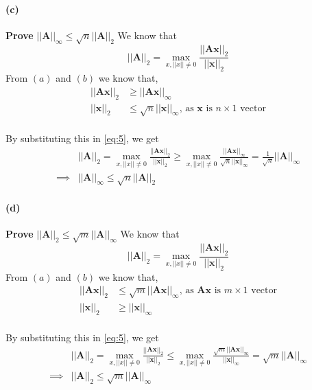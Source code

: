 \documentclass[12pt, letterpaper]{article}
\begin{document}
\paragraph{(c)} \textbf{Prove} $||\mathbf{A}||_\infty \leq \sqrt{n}||\mathbf{A}||_2$
We know that
\begin{equation}
  \label{eq:5}
  ||\mathbf{A}||_2 = \max_{x, ||x|| \not = 0}\frac{||\mathbf{Ax}||_2}{||\mathbf{x}||_2}
\end{equation}
From $(a)$ and $(b)$ we know that,
\begin{align*}
  ||\mathbf{Ax}||_2 &\geq ||\mathbf{Ax}||_{\infty}\\
  ||\mathbf{x}||_2 &\leq \sqrt{n}||\mathbf{x}||_{\infty}\text{, as $\mathbf{x}$ is $n \times 1$ vector}\\
\end{align*}

By substituting this in \eqref{eq:5}, we get
\begin{align*}
  &||\mathbf{A}||_2 = \max_{x, ||x|| \not = 0}\frac{||\mathbf{Ax}||_2}{||\mathbf{x}||_2}
  \geq \max_{x, ||x|| \not = 0}\frac{||\mathbf{Ax}||_{\infty}}{\sqrt{n}||\mathbf{x}||_{\infty}}
  = \frac{1}{\sqrt{n}}||\mathbf{A}||_{\infty}\\
  \implies &\boxed{||\mathbf{A}||_\infty \leq \sqrt{n}||\mathbf{A}||_2}
\end{align*}

\paragraph{(d)} \textbf{Prove} $||\mathbf{A}||_2 \leq \sqrt{m}||\mathbf{A}||_\infty$
We know that
\begin{equation}
  \label{eq:5}
  ||\mathbf{A}||_2 = \max_{x, ||x|| \not = 0}\frac{||\mathbf{Ax}||_2}{||\mathbf{x}||_2}
\end{equation}
From $(a)$ and $(b)$ we know that,
\begin{align*}
  ||\mathbf{Ax}||_2 &\leq \sqrt{m}||\mathbf{Ax}||_{\infty}\text{, as $\mathbf{Ax}$ is $m \times 1$ vector}\\
  ||\mathbf{x}||_2 &\geq ||\mathbf{x}||_{\infty}\\
\end{align*}

By substituting this in \eqref{eq:5}, we get
\begin{align*}
  &||\mathbf{A}||_2 = \max_{x, ||x|| \not = 0}\frac{||\mathbf{Ax}||_2}{||\mathbf{x}||_2}
  \leq \max_{x, ||x|| \not = 0}\frac{\sqrt{m}||\mathbf{Ax}||_{\infty}}{||\mathbf{x}||_{\infty}}
  = \sqrt{m}||\mathbf{A}||_{\infty}\\
  \implies &\boxed{||\mathbf{A}||_2 \leq \sqrt{m}||\mathbf{A}||_\infty}
\end{align*}
\end{document}
